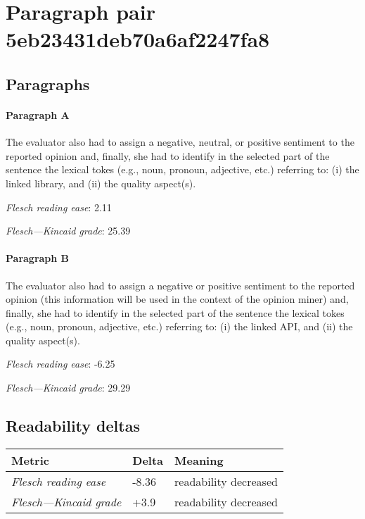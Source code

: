 \section{Paragraph pair 5eb23431deb70a6af2247fa8}
\subsection{Paragraphs}
\paragraph{Paragraph A}
The evaluator also had to assign a negative, neutral, or positive sentiment to the reported opinion and, finally, she had to identify in the selected part of the sentence the lexical tokes (e.g., noun, pronoun, adjective, etc.) referring to: (i) the linked library, and (ii) the quality aspect(s).\par\medskip
\emph{Flesch reading ease}: 2.11\par
\emph{Flesch---Kincaid grade}: 25.39

\paragraph{Paragraph B}
The evaluator also had to assign a negative or positive sentiment to the reported opinion (this information will be used in the context of the opinion miner) and, finally, she had to identify in the selected part of the sentence the lexical tokes (e.g., noun, pronoun, adjective, etc.) referring to: (i) the linked API, and (ii) the quality aspect(s).\par\medskip
\emph{Flesch reading ease}: -6.25\par
\emph{Flesch---Kincaid grade}: 29.29

\subsection{Readability deltas}

\begin{tabular}{lll}
\toprule
               \textbf{Metric} & \textbf{Delta} &       \textbf{Meaning} \\
\midrule
    \emph{Flesch reading ease} &          -8.36 &  readability decreased \\
 \emph{Flesch---Kincaid grade} &           +3.9 &  readability decreased \\
\bottomrule
\end{tabular}

